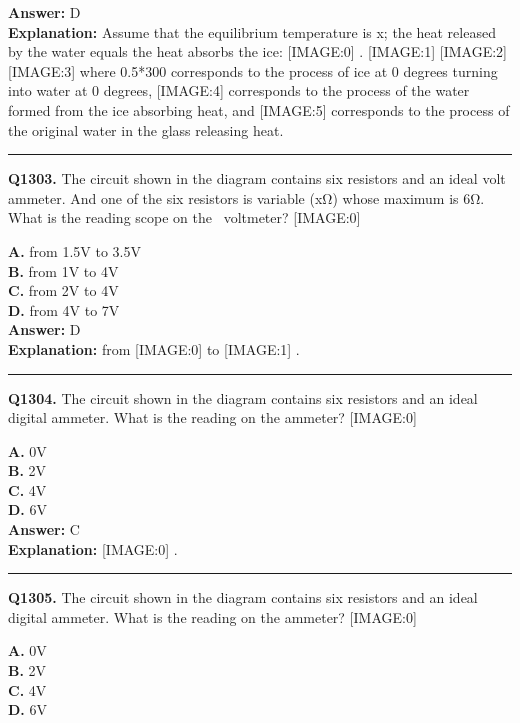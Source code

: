 \documentclass[12pt]{article}
\begin{document}
\textbf{Answer:} D \\
\textbf{Explanation:} Assume that the equilibrium temperature is x; the heat released by the water equals the heat absorbs the ice:
[IMAGE:0]
.
[IMAGE:1]
[IMAGE:2]
[IMAGE:3]
where 0.5*300
corresponds to the process of ice at 0 degrees turning into water at 0 degrees,
[IMAGE:4]
corresponds to the process of the water formed from the ice absorbing heat, and
[IMAGE:5]
corresponds to the process of the original water in the glass releasing heat.

\hrule
\vspace{1em}


\noindent
\textbf{Q1303.} The circuit shown in the diagram contains six resistors and an ideal volt ammeter. And one of the six resistors is variable (xΩ) whose maximum is 6Ω.
What is the reading scope on the  voltmeter?
[IMAGE:0]



\textbf{A.} from 1.5V to 3.5V \\
\textbf{B.} from 1V to 4V \\
\textbf{C.} from 2V to 4V \\
\textbf{D.} from 4V to 7V \\

\textbf{Answer:} D \\
\textbf{Explanation:} from
[IMAGE:0]
to
[IMAGE:1]
.

\hrule
\vspace{1em}


\noindent
\textbf{Q1304.} The circuit shown in the diagram contains six resistors and an ideal digital ammeter.
What is the reading on the ammeter?
[IMAGE:0]



\textbf{A.} 0V \\
\textbf{B.} 2V \\
\textbf{C.} 4V \\
\textbf{D.} 6V \\

\textbf{Answer:} C \\
\textbf{Explanation:} [IMAGE:0]
.

\hrule
\vspace{1em}


\noindent
\textbf{Q1305.} The circuit shown in the diagram contains six resistors and an ideal digital ammeter.
What is the reading on the ammeter?
[IMAGE:0]



\textbf{A.} 0V \\
\textbf{B.} 2V \\
\textbf{C.} 4V \\
\textbf{D.} 6V \\
\end{document}
